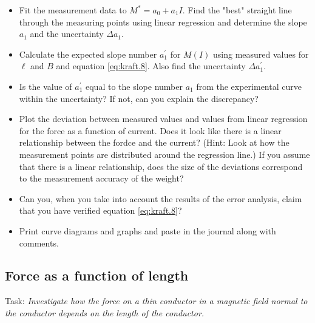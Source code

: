 \documentclass[../Elmag-labhefte-2020.tex]{subfiles}
\begin{document}
\begin{itemize}
    \item Fit the measurement data to $M^\ast = a_0 + a_1 I$. Find the "best" straight line through the measuring points using linear regression and determine the slope $a_1$ and the uncertainty $\Delta a_1$.
    \item Calculate the expected slope number $a_1^\prime$ for $M(I)$ using measured values   for $\ell$ and $B$ and equation \eqref{eq:kraft.8}. Also find the uncertainty $\Delta a_1^\prime$.
    \item Is the value of $a_1^\prime$ equal to the slope number $a_1$ from the experimental curve within the uncertainty? If not, can you explain the discrepancy?
    \item Plot the deviation between measured values and values from linear regression for the force as a function of current. Does it look like there is a linear relationship between the fordce and the current? (Hint: Look at how the measurement points are distributed around the regression line.) If you assume that there is a linear relationship, does the size of the deviations correspond to the measurement accuracy of the weight? %
    \item Can you, when you take into account the results of the error analysis, claim that you have verified equation \eqref{eq:kraft.8}?
    \item Print curve diagrams and graphs and paste in the journal along with comments.
\end{itemize}

\subsection{Force as a function of length \label{ch.kraft.lengde}}

Task:
\emph{Investigate how the force on a thin conductor in a magnetic field normal to the conductor depends on the length of the conductor.}
\end{document}
